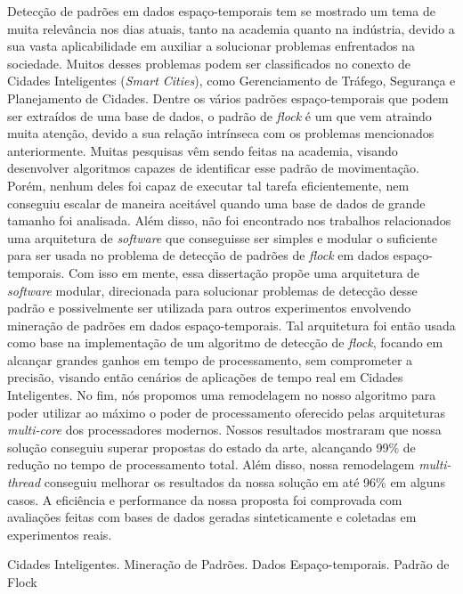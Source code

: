 \noindent
Detecção de padrões em dados espaço-temporais tem se mostrado um tema de muita relevância nos dias atuais, tanto na
academia quanto na indústria, devido a sua vasta aplicabilidade em auxiliar a solucionar problemas enfrentados na
sociedade. Muitos desses problemas podem ser classificados no conexto de Cidades Inteligentes (\textit{Smart Cities}),
como Gerenciamento de Tráfego, Segurança e Planejamento de Cidades. Dentre os vários padrões espaço-temporais que podem
ser extraídos de uma base de dados, o padrão de \textit{flock} é um que vem atraindo muita atenção, devido a sua relação
intrínseca com os problemas mencionados anteriormente. Muitas pesquisas vêm sendo feitas na academia, visando
desenvolver algoritmos capazes de identificar esse padrão de movimentação. Porém, nenhum deles foi capaz de executar tal
tarefa eficientemente, nem conseguiu escalar de maneira aceitável quando uma base de dados de grande tamanho foi
analisada. Além disso, não foi encontrado nos trabalhos relacionados uma arquitetura de \textit{software} que
conseguisse ser simples e modular o suficiente para ser usada no problema de detecção de padrões de \textit{flock} em
dados espaço-temporais. Com isso em mente, essa dissertação propõe uma arquitetura de \textit{software} modular,
direcionada para solucionar problemas de detecção desse padrão e possivelmente ser utilizada para outros experimentos
envolvendo mineração de padrões em dados espaço-temporais. Tal arquitetura foi então usada como base na implementação de
um algoritmo de detecção de \textit{flock}, focando em alcançar grandes ganhos em tempo de processamento, sem
comprometer a precisão, visando então cenários de aplicações de tempo real em Cidades Inteligentes.  No fim, nós
propomos uma remodelagem no nosso algoritmo para poder utilizar ao máximo o poder de processamento oferecido pelas
arquiteturas \textit{multi-core} dos processadores modernos. Nossos resultados mostraram que nossa solução conseguiu
superar propostas do estado da arte, alcançando 99\% de redução no tempo de processamento total. Além disso, nossa
remodelagem \textit{multi-thread} conseguiu melhorar os resultados da nossa solução em até 96\% em alguns casos. A
eficiência e performance da nossa proposta foi comprovada com avaliações feitas com bases de dados geradas
sinteticamente e coletadas em experimentos reais.

\begin{keywords}
Cidades Inteligentes. Mineração de Padrões. Dados Espaço-temporais. Padrão de Flock
\end{keywords}
